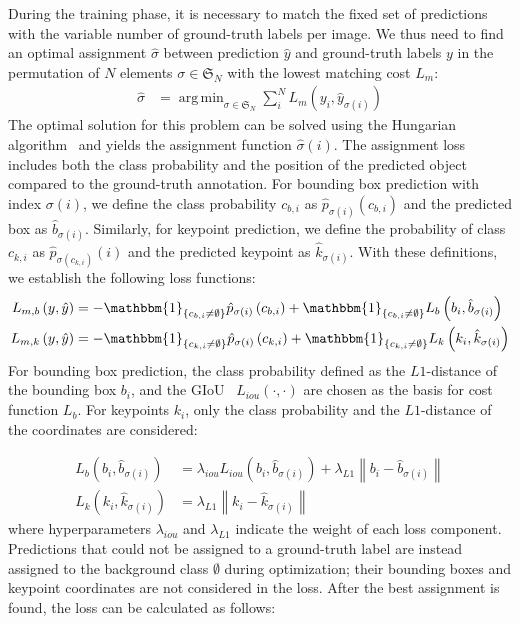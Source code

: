 \documentclass[sigconf]{acmart}
\DeclareMathOperator*{\argmin}{arg\,min}
\begin{document}
During the training phase, it is necessary to match the fixed set of predictions with the variable number of ground-truth labels per image. We thus need to find an optimal assignment $\hat{\sigma}$ between prediction $\hat{y}$ and ground-truth labels $y$ in the permutation of $N$ elements $\sigma \in \mathfrak{S}_N$ with the lowest matching cost $L_m$:
\begin{align}
    \hat{\sigma}&= \argmin_{\sigma \in \mathfrak{S}_N}\sum_{i}^{N}L_m\left(y_i,\hat{y}_{\sigma\left(i\right)}\right)
\end{align}
The optimal solution for this problem can be solved using the Hungarian algorithm~\cite{kuhn1955hungarian} and yields the assignment function $\hat{\sigma}\left(i\right)$. The assignment loss includes both the class probability and the position of the predicted object compared to the ground-truth annotation. For bounding box prediction with index $\sigma(i)$, we define the class probability $c_{b,i}$ as $\hat{p}_{\sigma\left(i\right)}\left(c_{b,i}\right)$ and the predicted box as $\hat{b}_{\sigma\left(i\right)}$. Similarly, for keypoint prediction, we define the probability of class $c_{k,i}$ as $\hat{p}_{\sigma\left(c_{k,i}\right)}\left(i\right)$ and the predicted keypoint as $\hat{k}_{\sigma\left(i\right)}$.
With these definitions, we establish the following loss functions:
\begin{align}
    L_{m, b}\left(y,\hat{y}\right)&= -\mathbbm{1}_{\left\{c_{b,i}\neq \emptyset\right\}}\hat{p}_{\sigma\left(i\right)}\left(c_{b,i}\right)+\mathbbm{1}_{\left\{c_{b,i}\neq\emptyset\right\}}L_b\left(b_i,\hat{b}_{\sigma\left(i\right)}\right)\\
    L_{m, k}\left(y,\hat{y}\right)&= -\mathbbm{1}_{\left\{c_{k,i}\neq \emptyset\right\}}\hat{p}_{\sigma\left(i\right)}\left(c_{k,i}\right)+\mathbbm{1}_{\left\{c_{k,i}\neq\emptyset\right\}}L_k\left(k_i,\hat{k}_{\sigma\left(i\right)}\right)
\end{align}
For bounding box prediction, the class probability defined as the $L1$-distance of the bounding box $b_i$, and the \ac{GIoU}~\cite{DBLP:conf/cvpr/RezatofighiTGS019} $L_{iou}\left(\cdot,\cdot\right)$ are chosen as the basis for cost function $L_b$. 
For keypoints $k_i$, only the class probability and the $L1$-distance of the coordinates are considered:

\begin{align}
L_b\left(b_i,\hat{b}_{\sigma\left(i\right)}\right)&=\lambda_{iou}L_{iou}\left(b_i,\hat{b}_{\sigma\left(i\right)}\right)+\lambda_{L1}\left\|b_i-\hat{b}_{\sigma\left(i\right)}\right\|\\
L_k\left(k_i,\hat{k}_{\sigma\left(i\right)}\right)&=\lambda_{L1}\left\|k_i-\hat{k}_{\sigma\left(i\right)}\right\|
\end{align}
where hyperparameters $\lambda_{iou}$ and $\lambda_{L1}$ indicate the weight of each loss component. 
Predictions that could not be assigned to a ground-truth label are instead assigned to the background class $\emptyset$ during optimization; 
their bounding boxes and keypoint coordinates are not considered in the loss. 
After the best assignment is found, the loss can be calculated as follows:
\end{document}
